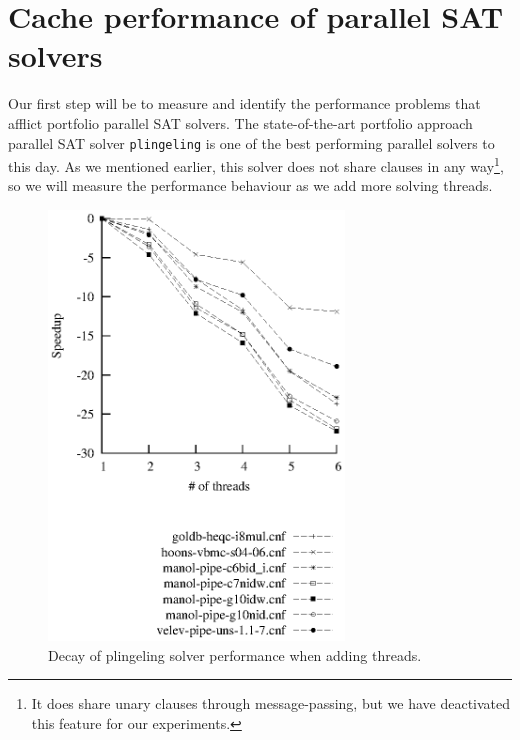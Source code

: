 \documentclass[12pt]{diicc}
\begin{document}
\section{Cache performance of parallel SAT solvers}

Our first step will be to measure and identify the performance problems that afflict portfolio parallel SAT solvers. The state-of-the-art portfolio approach parallel SAT solver \texttt{plingeling} is one of the best performing parallel solvers to this day. As we mentioned earlier, this solver does not share clauses in any way\footnote{It does share unary clauses through message-passing, but we have deactivated this feature for our experiments.}, so we will measure the performance behaviour as we add more solving threads.

\begin{figure}[h!]
	\centering
		\includegraphics[width=0.7\textwidth]{plingeling_decay}
	\caption{Decay of plingeling solver performance when adding threads.}
	\label{fig:plingeling decay}
\end{figure}
\end{document}
